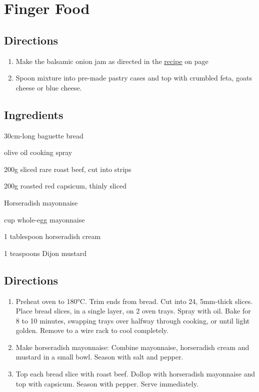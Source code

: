 \chapter{Finger Food}
\section*{Directions}
\begin{enumerate}
	\item Make the balsamic onion jam as directed in the \hyperlink{caramelised_onion}{recipe} on page \pageref{caramelised_onion}
	\item Spoon mixture into pre-made pastry cases and top with crumbled feta, goats cheese or blue cheese.
\end{enumerate}

\section*{Ingredients}
\begin{ingredients-list}
	\item 30cm-long baguette bread
	\item olive oil cooking spray
	\item 200g sliced rare roast beef, cut into strips
	\item 200g roasted red capsicum, thinly sliced
	\item Horseradish mayonnaise
	\item {} cup whole-egg mayonnaise
	\item 1 tablespoon horseradish cream
	\item 1 teaspoons Dijon mustard 
\end{ingredients-list}
\section*{Directions}
\begin{enumerate}
	\item Preheat oven to 180°C. Trim ends from bread. Cut into 24, 5mm-thick slices. Place bread slices, in a single layer, on 2 oven trays. 
	Spray with oil. Bake for 8 to 10 minutes, swapping trays over halfway through cooking, or until light golden. Remove to a wire rack to cool completely.
	\item Make horseradish mayonnaise: Combine mayonnaise, horseradish cream and mustard in a small bowl. Season with salt and pepper.
	\item Top each bread slice with roast beef. Dollop with horseradish mayonnaise and top with capsicum. Season with pepper. Serve immediately.
\end{enumerate}

